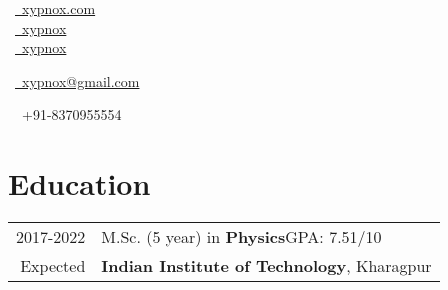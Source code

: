 \documentclass[a4paper,12pt]{extarticle} %
\let\oldtextbf\textbf
\renewcommand{\textbf}[1]{\textcolor{bold}{\oldtextbf{#1}}}
\begin{document}
\pagestyle{empty} %


\begin{multicols}{3}
  \normalsize  \faGlobe\ {\href{http://xypnox.com/}{\  xypnox.com}}\\
  \normalsize \faGithub\ {\href{https://github.com/xypnox}{\  xypnox}}\\
  \normalsize  \faTwitter\ {\href{https://twitter.com/xypnox}{\  xypnox}}\\
  \columnbreak
  \normalsize\par{
    \centering{\large\textsc{\textcolor{primary}{xypnox}}}

  } %

  \columnbreak
  \raggedright\hfill\normalsize \faEnvelope\ {\href{mailto:xypnox@gmail.com}{\  xypnox@gmail.com}}\\
  \raggedright\hfill{\faPhone\ \  +91-8370955554}
\end{multicols}

\vspace{-0.5cm}



\section{\textcolor{primary}{Education}}

\begin{tabular}{r|p{15.7cm}}
  \textsc{2017-2022} & M.Sc. (5 year) in \textbf{Physics}\hfill\textsc{GPA}: 7.51/10 \\
  Expected           & \textbf{Indian Institute of Technology}, Kharagpur            \\
\end{tabular}
\end{document}
